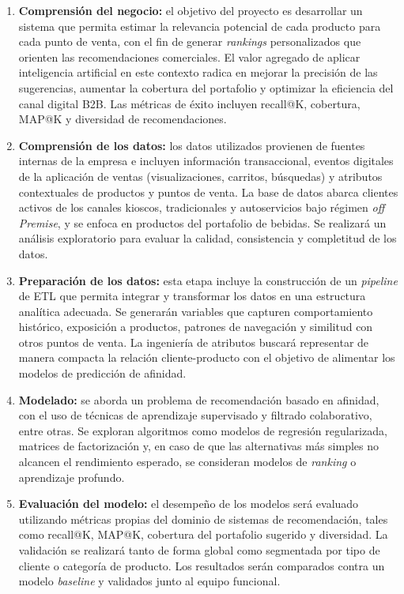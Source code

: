 \documentclass[
11pt, %
]{charter}
\begin{document}
\begin{enumerate}
\item \textbf{Comprensión del negocio:}
el objetivo del proyecto es desarrollar un sistema que permita estimar la relevancia potencial de cada producto para cada punto de venta, con el fin de generar \textit{rankings} personalizados que orienten las recomendaciones comerciales. El valor agregado de aplicar inteligencia artificial en este contexto radica en mejorar la precisión de las sugerencias, aumentar la cobertura del portafolio y optimizar la eficiencia del canal digital B2B. Las métricas de éxito incluyen recall@K, cobertura, MAP@K y diversidad de recomendaciones.

\item \textbf{Comprensión de los datos:}
los datos utilizados provienen de fuentes internas de la empresa e incluyen información transaccional, eventos digitales de la aplicación de ventas (visualizaciones, carritos, búsquedas) y atributos contextuales de productos y puntos de venta. La base de datos abarca clientes activos de los canales kioscos, tradicionales y autoservicios bajo régimen \textit{off Premise}, y se enfoca en productos del portafolio de bebidas. Se realizará un análisis exploratorio para evaluar la calidad, consistencia y completitud de los datos.

\item \textbf{Preparación de los datos:}
esta etapa incluye la construcción de un \textit{pipeline} de ETL que permita integrar y transformar los datos en una estructura analítica adecuada. Se generarán variables que capturen comportamiento histórico, exposición a productos, patrones de navegación y similitud con otros puntos de venta. La ingeniería de atributos buscará representar de manera compacta la relación cliente-producto con el objetivo de alimentar los modelos de predicción de afinidad.

\item \textbf{Modelado:}
se aborda un problema de recomendación basado en afinidad, con el uso de técnicas de aprendizaje supervisado y filtrado colaborativo, entre otras. Se exploran algoritmos como modelos de regresión regularizada, matrices de factorización y, en caso de que las alternativas más simples no alcancen el rendimiento esperado, se consideran modelos de \textit{ranking} o aprendizaje profundo.

\item \textbf{Evaluación del modelo:}
el desempeño de los modelos será evaluado utilizando métricas propias del dominio de sistemas de recomendación, tales como recall@K, MAP@K, cobertura del portafolio sugerido y diversidad. La validación se realizará tanto de forma global como segmentada por tipo de cliente o categoría de producto. Los resultados serán comparados contra un modelo \textit{baseline} y validados junto al equipo funcional.


\end{enumerate}
\end{document}
